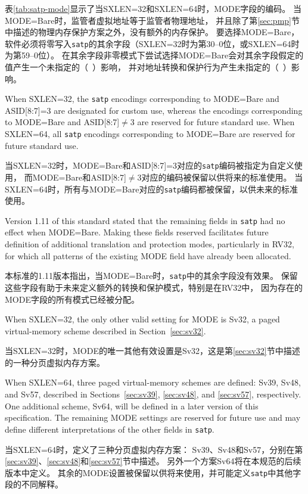 表\ref{tab:satp-mode}显示了当SXLEN=32和SXLEN=64时，MODE字段的编码。
当MODE=Bare时，监管者虚拟地址等于监管者物理地址，
并且除了第\ref{sec:pmp}节中描述的物理内存保护方案之外，没有额外的内存保护。
要选择MODE=Bare，软件必须将零写入{\tt satp}的其余字段（SXLEN=32时为第30--0位，或SXLEN=64时为第59--0位）。
在其余字段非零模式下尝试选择MODE=Bare会对其余字段假定的值产生一个未指定的（\unspecified\ ）影响，
并对地址转换和保护行为产生未指定的（\unspecified\ ）影响。

When SXLEN=32, the {\tt satp} encodings corresponding to MODE=Bare and ASID[8:7]=3 are designated
for custom use, whereas the encodings corresponding to MODE=Bare and ASID[8:7]$\ne$3 are
reserved for future standard use.
When SXLEN=64, all {\tt satp} encodings corresponding to MODE=Bare are reserved for future
standard use.

当SXLEN=32时，MODE=Bare和ASID[8:7]=3对应的{\tt satp}编码被指定为自定义使用，
而MODE=Bare和ASID[8:7]$\ne$3对应的编码被保留以供将来的标准使用。
当SXLEN=64时，所有与MODE=Bare对应的{\tt satp}编码都被保留，以供未来的标准使用。

\begin{commentary}
Version 1.11 of this standard stated that the remaining fields in {\tt satp}
had no effect when MODE=Bare.
Making these fields reserved facilitates future definition of
additional translation and protection modes, particularly in RV32, for which
all patterns of the existing MODE field have already been allocated.

本标准的1.11版本指出，当MODE=Bare时，{\tt satp}中的其余字段没有效果。
保留这些字段有助于未来定义额外的转换和保护模式，特别是在RV32中，
因为存在的MODE字段的所有模式已经被分配。  

\end{commentary}
When SXLEN=32, the only other valid setting for MODE is Sv32, a paged
virtual-memory scheme described in Section~\ref{sec:sv32}.

当SXLEN=32时，MODE的唯一其他有效设置是Sv32，这是第\ref{sec:sv32}节中描述的一种分页虚拟内存方案。

When SXLEN=64, three paged virtual-memory schemes are defined: Sv39, Sv48, and Sv57,
described in Sections~\ref{sec:sv39}, \ref{sec:sv48}, and \ref{sec:sv57}, respectively.
One additional scheme, Sv64, will be defined in a later version
of this specification.  The remaining MODE settings are reserved
for future use and may define different interpretations of the other fields in
{\tt satp}.

当SXLEN=64时，定义了三种分页虚拟内存方案：
Sv39、Sv48和Sv57，分别在第\ref{sec:sv39}、\ref{sec:sv48}和\ref{sec:sv57}节中描述。
另外一个方案Sv64将在本规范的后续版本中定义。
其余的MODE设置被保留以供将来使用，并可能定义{\tt satp}中其他字段的不同解释。

